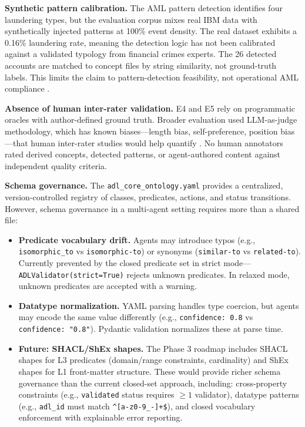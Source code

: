 \textbf{Synthetic pattern calibration.} The AML pattern detection identifies four laundering types, but the evaluation corpus mixes real IBM data with synthetically injected patterns at 100\% event density. The real dataset exhibits a 0.16\% laundering rate, meaning the detection logic has not been calibrated against a validated typology from financial crimes experts. The 26 detected accounts are matched to concept files by string similarity, not ground-truth labels. This limits the claim to pattern-detection feasibility, not operational AML compliance \cite{ref16}.

\textbf{Absence of human inter-rater validation.} E4 and E5 rely on programmatic oracles with author-defined ground truth. Broader evaluation used LLM-as-judge methodology, which has known biases---length bias, self-preference, position bias---that human inter-rater studies would help quantify \cite{ref17}. No human annotators rated derived concepts, detected patterns, or agent-authored content against independent quality criteria.

\textbf{Schema governance.} The \texttt{adl\_core\_ontology.yaml} provides a centralized, version-controlled registry of classes, predicates, actions, and status transitions. However, schema governance in a multi-agent setting requires more than a shared file:

\begin{itemize}
\tightlist
\item
  \textbf{Predicate vocabulary drift.} Agents may introduce typos (e.g., \texttt{isomorphic\_to} vs \texttt{isomorphic-to}) or synonyms (\texttt{similar-to} vs \texttt{related-to}). Currently prevented by the closed predicate set in strict mode---\texttt{ADLValidator(strict=True)} rejects unknown predicates. In relaxed mode, unknown predicates are accepted with a warning.
\item
  \textbf{Datatype normalization.} YAML parsing handles type coercion, but agents may encode the same value differently (e.g., \texttt{confidence:\ 0.8} vs \texttt{confidence:\ "0.8"}). Pydantic validation normalizes these at parse time.
\item
  \textbf{Future: SHACL/ShEx shapes.} The Phase 3 roadmap includes SHACL shapes for L3 predicates (domain/range constraints, cardinality) and ShEx shapes for L1 front-matter structure. These would provide richer schema governance than the current closed-set approach, including: cross-property constraints (e.g., \texttt{validated} status requires \(\geq 1\) validator), datatype patterns (e.g., \texttt{adl\_id} must match \texttt{\^{}{[}a-z0-9\_-{]}+\$}), and closed vocabulary enforcement with explainable error reporting.
\end{itemize}

